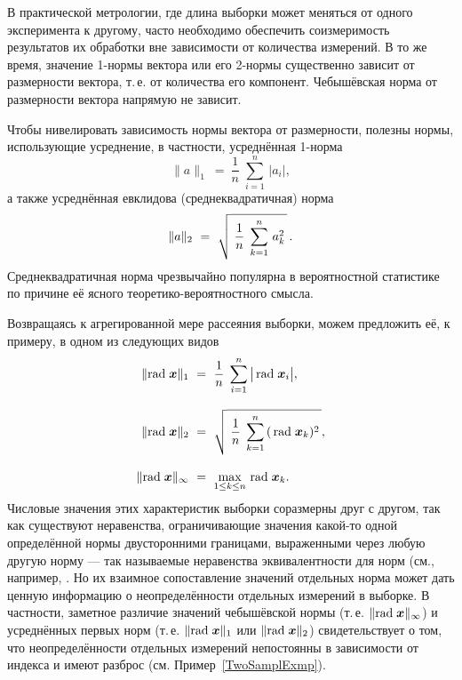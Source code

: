 \documentclass[a5paper,openany]{book}
\newcommand{\mbf}[1]{\protect\text{\boldmath$#1$}}
\renewcommand{\r}{\mathrm{rad}\;}
\begin{document}
В практической метрологии, где длина выборки может меняться от одного 
эксперимента к другому, часто необходимо обеспечить соизмеримость результатов 
их обработки вне зависимости от количества измерений. В то же время, значение 
1-нормы вектора или его 2-нормы существенно зависит от размерности вектора, 
т.\,е. от количества его компонент. Чебышёвская норма от размерности вектора 
напрямую не зависит. 
  
Чтобы нивелировать зависимость нормы вектора от размерности, полезны 
нормы, использующие усреднение, в частности, усреднённая 1-норма 
\begin{equation*} 
\|a\|_{1} \  = \  \frac{1}{n}\;\sum_{i=1}^n \,|a_{i}|, 
\end{equation*} 
а также усреднённая евклидова (среднеквадратичная) норма 
\begin{equation*} 
\|a\|_{2} \  = \  
   \sqrt{\;\frac{1}{n}\;\sum_{k=1}^{n}\,a_{k}^{2}\,}\,. 
\index{среднеквадратичная норма} 
\end{equation*} 
Среднеквадратичная норма чрезвычайно популярна в вероятностной статистике 
по причине её ясного теоретико-вероятностного смысла. 
 
Возвращаясь к агрегированной мере рассеяния выборки, можем предложить её, 
к примеру, в одном из следующих видов 
\begin{align*} 
\|\r\mbf{x}\|_{1} \  &= \  
   \frac{1}{n}\; \sum_{i=1}^n \,\bigl|\,\r\mbf{x}_{i}\bigr|,        \\[3mm]  
\|\r\mbf{x}\|_{2} \  &= \  
   \sqrt{\;\frac{1}{n}\;\sum_{k=1}^{n}\,(\,\r\mbf{x}_{k})^{2}\,},  \\[3mm]  
\|\r\mbf{x}\|_{\infty} \  &= \  \max_{1\leq k\leq n}\,\r\mbf{x}_{k}. 
\end{align*} 
Числовые значения этих характеристик выборки соразмерны друг с другом, так как 
существуют неравенства, ограничивающие значения какой-то одной определённой нормы 
двусторонними границами, выраженными через любую другую норму --- так называемые 
неравенства эквивалентности для норм (см., например, \cite{HornJohn}. Но их взаимное 
сопоставление значений отдельных норма может дать ценную информацию о неопределённости 
отдельных измерений в выборке. В частности, заметное различие значений чебышёвской 
нормы (т.\,е. $\|\r\mbf{x}\|_{\infty}$) и усреднённых первых норм (т.\,е. 
$\|\r\mbf{x}\|_{1}$ или $\|\r\mbf{x}\|_{2}$) свидетельствует о том, что неопределённости 
отдельных измерений непостоянны в зависимости от индекса и имеют разброс (см. 
Пример~\ref{TwoSamplExmp}). 
  
\end{document}
